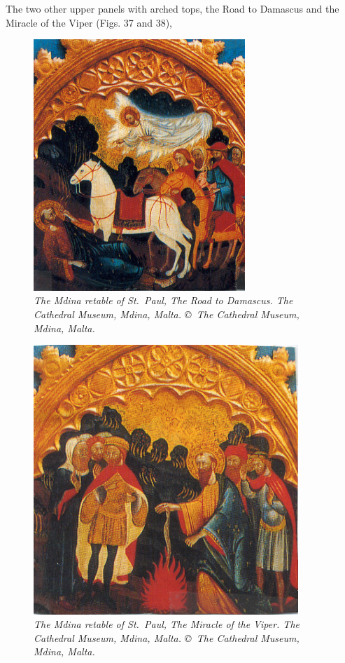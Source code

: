 \documentclass[a4paper,12pt]{article}
\begin{document}
The two other upper panels with arched tops, the Road to Damascus and
the Miracle of the Viper (Figs. 37 and 38), 
\begin{figure}[htbp]
\centering
\includegraphics[width=8cm]{pics/fig37.png}
\caption[The Mdina retable of St.~Paul, The Road to Damascus] 
{\it The Mdina retable of St.~Paul, The Road to Damascus.  
The Cathedral Museum, Mdina, Malta. \copyright\ The Cathedral Museum,
  Mdina, Malta.} 
\end{figure}
\begin{figure}[htbp]
\centering
\includegraphics[width=10cm]{pics/fig38.png}
\caption[The Mdina retable of St.~Paul, The Miracle of the Viper] 
{\it The Mdina retable of St.~Paul, The Miracle of the Viper.  
The Cathedral Museum, Mdina, Malta. \copyright\ The Cathedral Museum,
  Mdina, Malta.} 
\end{figure}
\end{document}
